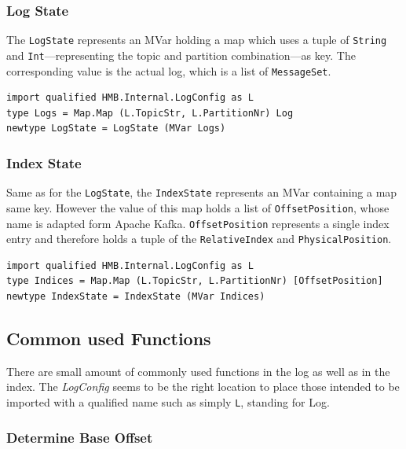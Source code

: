\newpage
\subsubsection{Log State}

The \lstinline{LogState} represents an MVar holding a map which uses a tuple of
\lstinline{String} and \lstinline{Int}---representing the topic and partition
 combination---as key. The corresponding value is the actual log, which is a list
of \lstinline{MessageSet}.

\begin{lstlisting}[caption={Definition of log state (MVar)}]
import qualified HMB.Internal.LogConfig as L
type Logs = Map.Map (L.TopicStr, L.PartitionNr) Log
newtype LogState = LogState (MVar Logs)
\end{lstlisting}

\subsubsection{Index State}

Same as for the \lstinline{LogState}, the \lstinline{IndexState} represents an
MVar containing a map same key. However the value
of this map holds a list of \lstinline{OffsetPosition}, whose name is
adapted form Apache Kafka. \lstinline{OffsetPosition} represents a single index
entry and therefore holds a tuple of the \lstinline{RelativeIndex} and
\lstinline{PhysicalPosition}. 

\begin{lstlisting}[caption={Definition of index state (MVar)}]
import qualified HMB.Internal.LogConfig as L
type Indices = Map.Map (L.TopicStr, L.PartitionNr) [OffsetPosition]
newtype IndexState = IndexState (MVar Indices)
\end{lstlisting}

\subsection{Common used Functions}

There are small amount of commonly used functions in the log as well as in the
index. The \textit{LogConfig} seems to be the right location to place those
intended to be imported with a qualified name such as simply \lstinline{L},
standing for Log.

\subsubsection{Determine Base Offset}
\label{subsubsec:broker-log-general-baseoffset}

